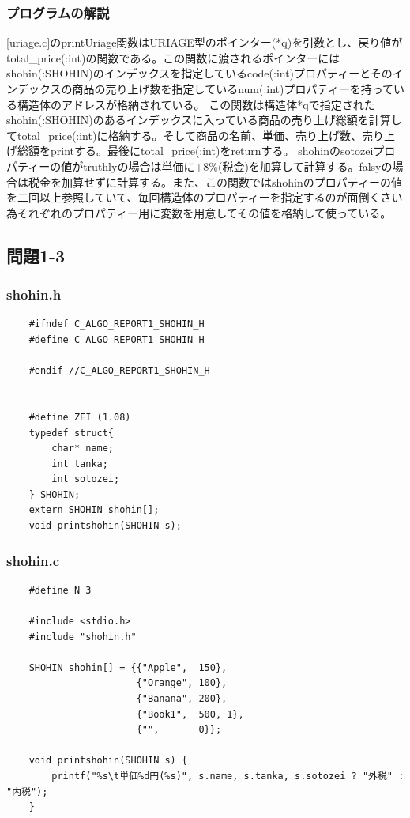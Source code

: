 \documentclass[10pt]{article}
\begin{document}
\subsubsection{プログラムの解説}
[uriage.c]のprintUriage関数はURIAGE型のポインター(*q)を引数とし、戻り値がtotal\_price(:int)の関数である。この関数に渡されるポインターにはshohin(:SHOHIN)のインデックスを指定しているcode(:int)プロパティーとそのインデックスの商品の売り上げ数を指定しているnum(:int)プロパティーを持っている構造体のアドレスが格納されている。
この関数は構造体*qで指定されたshohin(:SHOHIN)のあるインデックスに入っている商品の売り上げ総額を計算してtotal\_price(:int)に格納する。そして商品の名前、単価、売り上げ数、売り上げ総額をprintする。最後にtotal\_price(:int)をreturnする。
shohinのsotozeiプロパティーの値がtruthlyの場合は単価に+8\%(税金)を加算して計算する。falsyの場合は税金を加算せずに計算する。また、この関数ではshohinのプロパティーの値を二回以上参照していて、毎回構造体のプロパティーを指定するのが面倒くさい為それぞれのプロパティー用に変数を用意してその値を格納して使っている。
\pagebreak

\subsection{問題1-3}
\subsubsection{shohin.h}
    \begin{lstlisting}
    #ifndef C_ALGO_REPORT1_SHOHIN_H
    #define C_ALGO_REPORT1_SHOHIN_H
    
    #endif //C_ALGO_REPORT1_SHOHIN_H
    
    
    #define ZEI (1.08)
    typedef struct{
        char* name;
        int tanka;
        int sotozei;
    } SHOHIN;
    extern SHOHIN shohin[];
    void printshohin(SHOHIN s);
    \end{lstlisting}
\subsubsection{shohin.c}
    \begin{lstlisting}
    #define N 3
    
    #include <stdio.h>
    #include "shohin.h"
    
    SHOHIN shohin[] = {{"Apple",  150},
                       {"Orange", 100},
                       {"Banana", 200},
                       {"Book1",  500, 1},
                       {"",       0}};
    
    void printshohin(SHOHIN s) {
        printf("%s\t単価%d円(%s)", s.name, s.tanka, s.sotozei ? "外税" : "内税");
    }

    \end{lstlisting}
\end{document}
